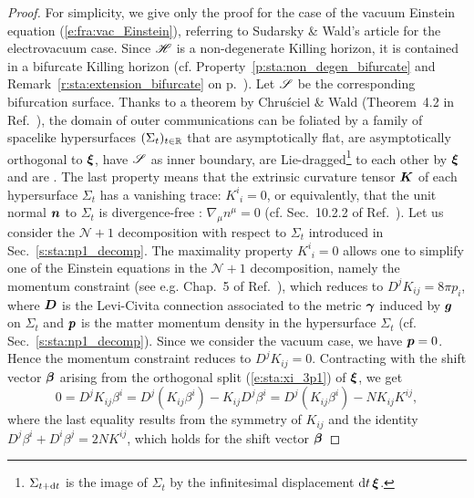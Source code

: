 \begin{proof}
For simplicity, we give only the proof for the case of the vacuum Einstein equation
(\ref{e:fra:vac_Einstein}), referring
to Sudarsky \& Wald's article \cite{SudarW93} for the electrovacuum case.
Since $\mathscr{H}$ is a non-degenerate Killing horizon, it is contained in a bifurcate Killing horizon
(cf. Property~\ref{p:sta:non_degen_bifurcate} and Remark~\ref{r:sta:extension_bifurcate} on p.~\pageref{r:sta:extension_bifurcate}).
Let $\mathscr{S}$ be the corresponding bifurcation surface.
Thanks to a theorem by Chru\'sciel \&
Wald (Theorem~4.2 in Ref.~\cite{ChrusW94a}),
the domain of outer communications can be foliated by a family of
spacelike hypersurfaces $(\Sigma_t)_{t\in\mathbb{R}}$
that are asymptotically flat, are asymptotically orthogonal to $\bm{\xi}$,
have $\mathscr{S}$ as inner boundary, are Lie-dragged\footnote{$\Sigma_{t+\mathrm{d} t}$ is the image of $\Sigma_t$ by the infinitesimal displacement $\mathrm{d} t\, \bm{\xi}$.}
to each other by $\bm{\xi}$ and are .
The last property means that the
extrinsic curvature
tensor $\bm{K}$ of each hypersurface $\Sigma_t$
has a vanishing trace: $K^i_{\ \, i} = 0$, or equivalently, that
the unit normal $\bm{n}$ to $\Sigma_t$ is divergence-free : $\nabla_\mu n^\mu = 0$
(cf. Sec.~10.2.2 of Ref.~\cite{Gourg12}).
Let us consider the $\mathcal{N}+1$ decomposition with respect to $\Sigma_t$
introduced in Sec.~\ref{s:sta:np1_decomp}.
The maximality property $K^i_{\ \, i} = 0$ allows one
to simplify one of the Einstein equations in the $\mathcal{N}+1$ decomposition,
namely the momentum constraint (see e.g. Chap.~5 of Ref.~\cite{Gourg12}),
which reduces to $D^j K_{ij} = 8\pi p_i$, where $\bm{D}$ is the Levi-Civita connection
associated to the metric $\bm{\gamma}$ induced by $\bm{g}$ on $\Sigma_t$ and $\bm{p}$ is the matter momentum density in the hypersurface $\Sigma_t$ (cf. Sec.~\ref{s:sta:np1_decomp}).
Since we consider the vacuum case, we have $\bm{p} = 0$. Hence the momentum
constraint reduces to $D^j K_{ij} = 0$. Contracting with the shift vector $\bm{\beta}$
arising from the orthogonal split (\ref{e:sta:xi_3p1}) of $\bm{\xi}$, we get
\[
    0 = D^j K_{ij} \beta^i
    =  D^j \left( K_{ij} \beta^i \right) - K_{ij} D^j \beta^i
     =  D^j \left( K_{ij} \beta^i \right) - N K_{ij} K^{ij}   ,
\]
where the last equality results from the symmetry of $K_{ij}$ and the identity
$D^j \beta^i + D^i \beta^j = 2N K^{ij}$, which holds for the shift vector $\bm{\beta}$

\end{proof}
